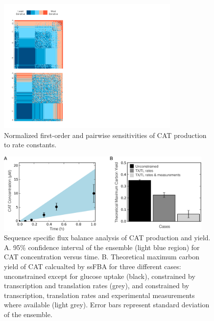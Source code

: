 \documentclass[12pt]{article}
\begin{document}
\begin{figure}[ht]
\centering
\includegraphics[width=0.8\textwidth,trim=0 28 615 40,clip]{./Figures/Sensitivity.pdf}
\caption{Normalized first-order and pairwise sensitivities of CAT production to rate constants.}
\label{fig:Sensitivity}
\end{figure}

\begin{figure}[ht]
\centering
\includegraphics[width=0.95\textwidth]{./Figures/CAT_prod_yield.pdf}
\caption{Sequence specific flux balance analysis of CAT production and yield. A. 95\% confidence interval of the ensemble (light blue region) for CAT concentration versus time. B. Theoretical maximum carbon yield of CAT calcualted by ssFBA for three different cases: unconstrained except for glucose uptake (black), constrained by transcription and translation rates (grey), and constrained by transcription, translation rates and experimental measurements where available (light grey). Error bars represent standard deviation of the ensemble.}
\label{fig:CATProdYield}
\end{figure}
\end{document}

